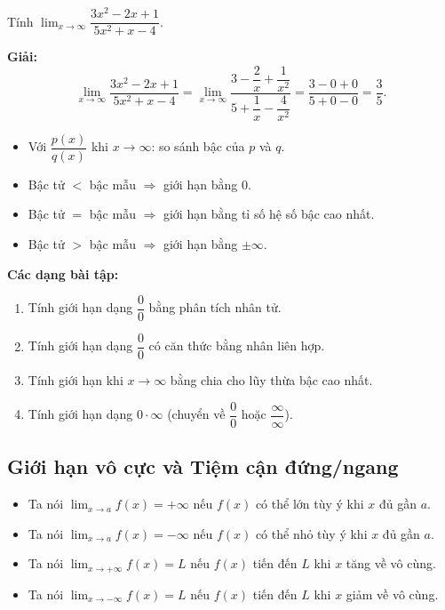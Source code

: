 \documentclass[12pt,a4paper]{article}
\begin{document}
\begin{vidu}
  Tính $\displaystyle\lim_{x \to \infty} \dfrac{3x^2 - 2x + 1}{5x^2 + x - 4}$.

  \medskip\textbf{Giải:}
  \[
    \lim_{x \to \infty} \dfrac{3x^2 - 2x + 1}{5x^2 + x - 4}
    = \lim_{x \to \infty} \dfrac{3 - \dfrac{2}{x} + \dfrac{1}{x^2}}{5 + \dfrac{1}{x} - \dfrac{4}{x^2}}
    = \dfrac{3 - 0 + 0}{5 + 0 - 0} = \dfrac{3}{5}.
  \]
\end{vidu}

\begin{luuy}
  \begin{itemize}
    \item Với $\dfrac{p(x)}{q(x)}$ khi $x \to \infty$: so sánh bậc của $p$ và $q$.
    \item Bậc tử $<$ bậc mẫu $\Rightarrow$ giới hạn bằng $0$.
    \item Bậc tử $=$ bậc mẫu $\Rightarrow$ giới hạn bằng tỉ số hệ số bậc cao nhất.
    \item Bậc tử $>$ bậc mẫu $\Rightarrow$ giới hạn bằng $\pm\infty$.
  \end{itemize}
\end{luuy}

\medskip\noindent\textbf{Các dạng bài tập:}
\begin{enumerate}[label=\textbf{Dạng \arabic*:}, leftmargin=*, align=left]
  \item Tính giới hạn dạng $\dfrac{0}{0}$ bằng phân tích nhân tử.
  \item Tính giới hạn dạng $\dfrac{0}{0}$ có căn thức bằng nhân liên hợp.
  \item Tính giới hạn khi $x \to \infty$ bằng chia cho lũy thừa bậc cao nhất.
  \item Tính giới hạn dạng $0 \cdot \infty$ (chuyển về $\dfrac{0}{0}$ hoặc $\dfrac{\infty}{\infty}$).
\end{enumerate}

\subsection{Giới hạn vô cực và Tiệm cận đứng/ngang}

\begin{dinhnghia}[title={Giới hạn vô cực}]
  \begin{itemize}
    \item Ta nói $\displaystyle\lim_{x \to a} f(x) = +\infty$ nếu $f(x)$ có thể lớn tùy ý khi $x$ đủ gần $a$.
    \item Ta nói $\displaystyle\lim_{x \to a} f(x) = -\infty$ nếu $f(x)$ có thể nhỏ tùy ý khi $x$ đủ gần $a$.
    \item Ta nói $\displaystyle\lim_{x \to +\infty} f(x) = L$ nếu $f(x)$ tiến đến $L$ khi $x$ tăng về vô cùng.
    \item Ta nói $\displaystyle\lim_{x \to -\infty} f(x) = L$ nếu $f(x)$ tiến đến $L$ khi $x$ giảm về vô cùng.
  \end{itemize}
\end{dinhnghia}
\end{document}
